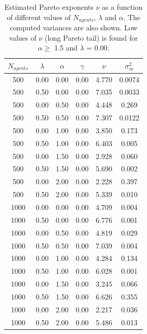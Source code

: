 \documentclass[11pt,a4paper,titlepage]{article}
\begin{document}
\begin{table}[h!]
\centering
\caption{Estimated Pareto exponents $\nu$ as a function of different values of $N_{agents}$, $\lambda$ and $\alpha$. The computed variances are also shown. Low values of $\nu$ (long Pareto tail) is found for $\alpha \geq$ 1.5 and $\lambda$ = 0.00.} \label{tab:nearest}
\begin{tabular}{| c | c | c | c | c | c |} \hline
\textbf{$N_{agents}$} & $\lambda$ & $\alpha$ & $\gamma$ &  $\nu$ & $\sigma^2_m$\\ \hline
500 & 0.00 & 0.00 & 0.00 & 4.770 & 0.0074 \\ \hline
500 & 0.50 & 0.00 & 0.00 & 7.035 & 0.0033 \\ \hline
500 & 0.00 & 0.50 & 0.00 & 4.448 & 0.269 \\ \hline
500 & 0.50 & 0.50 & 0.00 & 7.307 & 0.0122 \\ \hline
500 & 0.00 & 1.00 & 0.00 & 3.850 & 0.173 \\ \hline
500 & 0.50 & 1.00 & 0.00 & 6.403 & 0.005 \\ \hline
500 & 0.00 & 1.50 & 0.00 & 2.928 & 0.060  \\ \hline
500 & 0.50 & 1.50 & 0.00 & 5.690 & 0.002 \\ \hline
500 & 0.00 & 2.00 & 0.00 & 2.228 & 0.397 \\ \hline
500 & 0.50 & 2.00 & 0.00 & 5.339 & 0.010 \\ \hline
1000 & 0.00 & 0.00 & 0.00 & 4.709 & 0.004 \\ \hline
1000 & 0.50 & 0.00 & 0.00 & 6.776 & 0.001 \\ \hline
1000 & 0.00 & 0.50 & 0.00 & 4.819 & 0.029 \\ \hline
1000 & 0.50 & 0.50 & 0.00 & 7.039 & 0.004 \\ \hline
1000 & 0.00 & 1.00 & 0.00 & 4.284 & 0.134 \\ \hline
1000 & 0.50 & 1.00 & 0.00 & 6.028 & 0.001 \\ \hline
1000 & 0.00 & 1.50 & 0.00 & 3.245 & 0.066 \\ \hline
1000 & 0.50 & 1.50 & 0.00 & 6.626 & 0.355 \\ \hline
1000 & 0.00 & 2.00 & 0.00 & 2.217 & 0.036 \\ \hline
1000 & 0.50 & 2.00 & 0.00 & 5.486 & 0.013 \\ \hline

\end{tabular}
\end{table}
\end{document}
